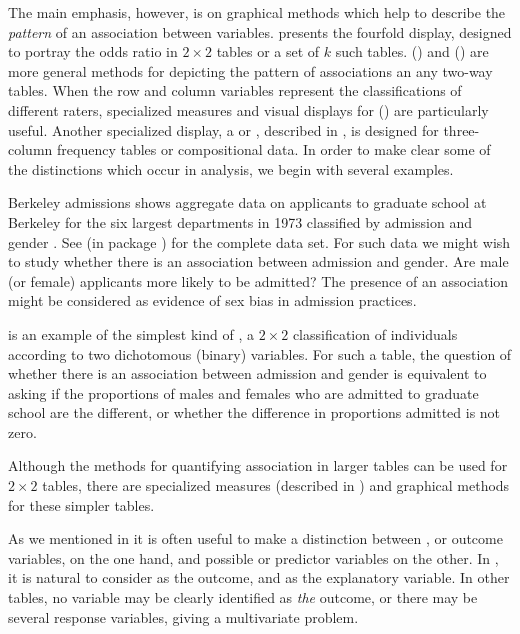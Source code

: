 \documentclass[10pt,krantz2]{krantz}\usepackage[]{graphicx}\usepackage[]{color}
\begin{document}
The main emphasis, however, is on graphical methods which help
to describe the \emph{pattern} of an association between variables.
 presents the fourfold display,
designed to portray the odds ratio in $2 \times 2$ tables or a set
of $k$ such tables.
() and 
() are more general methods for depicting
the pattern of associations an any two-way tables.
When the row and column variables represent the classifications
of different raters, specialized measures and visual displays
for  () are particularly
useful.
Another specialized display, a  or ,
described in ,
is designed
for three-column frequency tables or compositional data.
In order to make clear some of the distinctions which occur in
\ctab analysis, we begin with several examples.

\begin{Example}[berkeley1]{Berkeley admissions}
 shows aggregate data on applicants to
graduate school at Berkeley for the six largest departments in 1973
classified by admission and gender
\citep{Bickel-etal:75}.
See  (in package ) for the complete data set.
For such data we might wish to study whether there is an association
between admission and gender.
Are male (or female) applicants more likely to be admitted?
The presence of an association might be considered as
evidence of sex bias in admission practices.

 is an example of the simplest kind of \ctab,
a $2 \times 2$ classification of individuals according to two
dichotomous (binary) variables.
For such a table, the question of whether there is an association
between admission and gender is equivalent to asking if the
proportions of males and females who are admitted to graduate
school are the different, or whether the difference in proportions
admitted is not zero.

\end{Example}

Although the methods for quantifying association in larger tables can be
used for $2 \times 2$ tables, there are specialized measures
(described in ) and
graphical methods for these simpler tables.

As we mentioned in 
it is often useful to make a distinction between ,
or outcome variables, on the one hand,
and possible 
or predictor variables on the other.
In , it is natural to consider 
as the outcome, and  as the explanatory variable.
In other tables, no variable may be clearly identified as \emph{the}
outcome, or there may be several response variables, giving a
multivariate problem.
\end{document}
